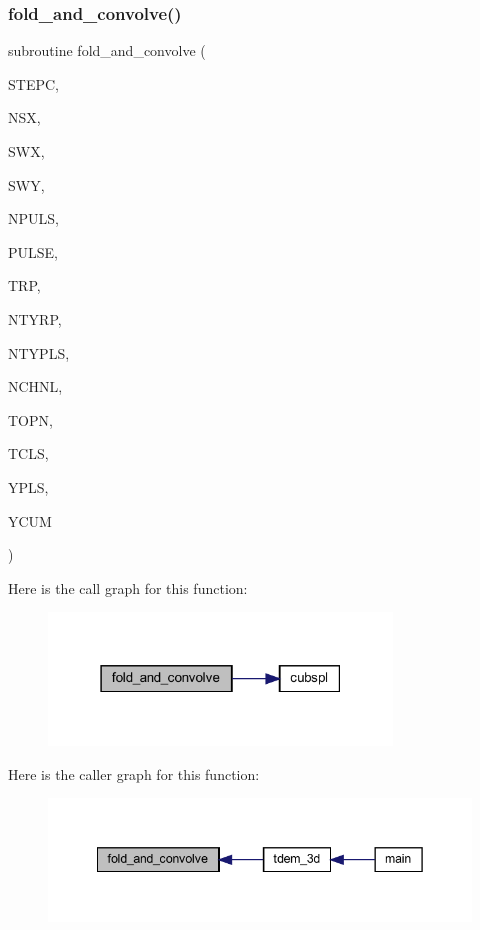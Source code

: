 \subsubsection{\texorpdfstring{fold\+\_\+and\+\_\+convolve()}{fold\_and\_convolve()}}
{\footnotesize\ttfamily subroutine fold\+\_\+and\+\_\+convolve (\begin{DoxyParamCaption}\item[{integer}]{S\+T\+E\+PC,  }\item[{integer}]{N\+SX,  }\item[{real, dimension(nsx)}]{S\+WX,  }\item[{real, dimension(nsx,3)}]{S\+WY,  }\item[{integer}]{N\+P\+U\+LS,  }\item[{real}]{P\+U\+L\+SE,  }\item[{real, dimension(ntyrp)}]{T\+RP,  }\item[{integer}]{N\+T\+Y\+RP,  }\item[{integer}]{N\+T\+Y\+P\+LS,  }\item[{integer}]{N\+C\+H\+NL,  }\item[{real, dimension(nchnl)}]{T\+O\+PN,  }\item[{real, dimension(nchnl)}]{T\+C\+LS,  }\item[{real, dimension(4,ntyrp)}]{Y\+P\+LS,  }\item[{real, dimension(nchnl)}]{Y\+C\+UM }\end{DoxyParamCaption})}

Here is the call graph for this function\+:
\nopagebreak
\begin{figure}[H]
\begin{center}
\leavevmode
\includegraphics[width=259pt]{Marco_8f90_adf5b72e5e0c8b51d6d076cc274531811_cgraph}
\end{center}
\end{figure}
Here is the caller graph for this function\+:
\nopagebreak
\begin{figure}[H]
\begin{center}
\leavevmode
\includegraphics[width=342pt]{Marco_8f90_adf5b72e5e0c8b51d6d076cc274531811_icgraph}
\end{center}
\end{figure}
\mbox{\label{Marco_8f90_a74a15aabfd889793f141e6d8ac9592c4}} 
